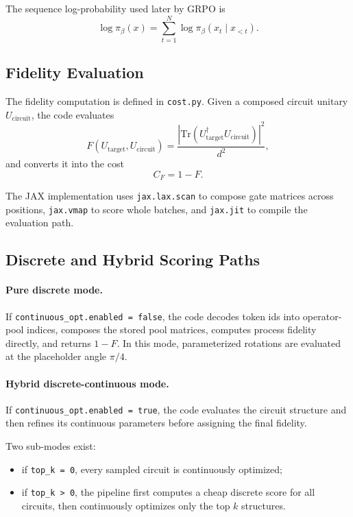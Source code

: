 \documentclass[11pt]{article}
\begin{document}
The sequence log-probability used later by GRPO is
\[
\log \pi_\beta(x)
=
\sum_{t=1}^{N}
\log \pi_\beta(x_t \mid x_{<t}).
\]

\subsection{Fidelity Evaluation}

The fidelity computation is defined in \texttt{cost.py}. Given a composed circuit unitary $U_{\mathrm{circuit}}$, the code evaluates
\[
F(U_{\mathrm{target}}, U_{\mathrm{circuit}})
=
\frac{\left|\mathrm{Tr}(U_{\mathrm{target}}^\dagger U_{\mathrm{circuit}})\right|^2}{d^2},
\]
and converts it into the cost
\[
C_F = 1 - F.
\]

The JAX implementation uses \texttt{jax.lax.scan} to compose gate matrices across positions, \texttt{jax.vmap} to score whole batches, and \texttt{jax.jit} to compile the evaluation path.

\subsection{Discrete and Hybrid Scoring Paths}

\paragraph{Pure discrete mode.}
If \texttt{continuous\_opt.enabled = false}, the code decodes token ids into operator-pool indices, composes the stored pool matrices, computes process fidelity directly, and returns $1 - F$. In this mode, parameterized rotations are evaluated at the placeholder angle $\pi/4$.

\paragraph{Hybrid discrete-continuous mode.}
If \texttt{continuous\_opt.enabled = true}, the code evaluates the circuit structure and then refines its continuous parameters before assigning the final fidelity.

Two sub-modes exist:

\begin{itemize}[leftmargin=*]
\item if \texttt{top\_k = 0}, every sampled circuit is continuously optimized;
\item if \texttt{top\_k > 0}, the pipeline first computes a cheap discrete score for all circuits, then continuously optimizes only the top $k$ structures.
\end{itemize}
\end{document}
